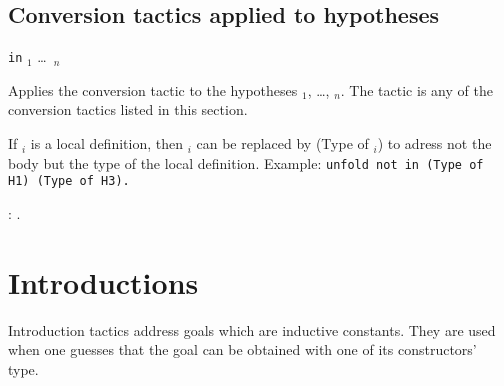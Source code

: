 
\subsection{Conversion tactics applied to hypotheses}

{\convtactic} {\tt in} \ident$_1$ \dots\ \ident$_n$ 

Applies the conversion tactic {\convtactic} to the
hypotheses \ident$_1$, \ldots, \ident$_n$. The tactic {\convtactic} is
any of the conversion tactics listed in this section. 

If \ident$_i$ is a local definition, then \ident$_i$ can be replaced
by (Type of \ident$_i$) to adress not the body but the type of the
local definition. Example: {\tt unfold not in (Type of H1) (Type of H3).}

\begin{ErrMsgs}
\item {} : {\ident}.
\end{ErrMsgs}


\section{Introductions}
Introduction tactics address goals which are inductive constants.
They are used when one guesses that the goal can be obtained with one
of its constructors' type.

